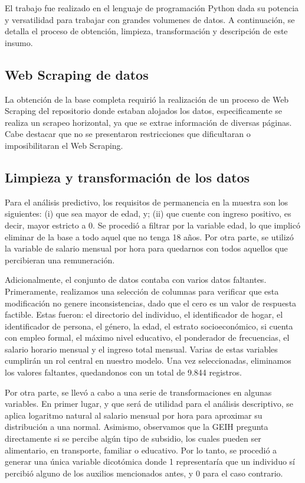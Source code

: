 \documentclass[11pt,oneside]{article}
\begin{document}
	El trabajo fue realizado en el lenguaje de programación Python dada su potencia y versatilidad para trabajar con grandes volumenes de datos. A continuación, se detalla el proceso de obtención, limpieza, transformación y descripción de este insumo. 
	
	\subsection{Web Scraping de datos}
	
	La obtención de la base completa requirió la realización de un proceso de Web Scraping del repositorio donde estaban alojados los datos, especificamente se realiza un scrapeo horizontal, ya que se extrae información de diversas páginas. Cabe destacar que no se presentaron restricciones que dificultaran o imposibilitaran el Web Scraping. 
	
	\subsection{Limpieza y transformación de los datos}
	
	Para el análisis predictivo, los requisitos de permanencia en la muestra son los siguientes: (i) que sea mayor de edad, y; (ii) que cuente con ingreso positivo, es decir, mayor estricto a 0. Se procedió a filtrar por la variable edad, lo que implicó eliminar de la base a todo aquel que no tenga 18 años. Por otra parte, se utilizó la variable de salario mensual por hora para quedarnos con todos aquellos que percibieran una remuneración. 
	
	Adicionalmente, el conjunto de datos contaba con varios datos faltantes. Primeramente, realizamos una selección de columnas para verificar que esta modificación no genere inconsistencias, dado que el cero es un valor de respuesta factible. Estas fueron: el directorio del individuo, el identificador de hogar, el identificador de persona, el género, la edad, el estrato socioeconómico, si cuenta con empleo formal, el máximo nivel educativo, el ponderador de frecuencias, el salario horario mensual y el ingreso total mensual. Varias de estas variables cumplirán un rol central en nuestro modelo. Una vez seleccionadas, eliminamos los valores faltantes, quedandonos con un total de 9.844 registros.  
	
	Por otra parte, se llevó a cabo a una serie de transformaciones en algunas variables. En primer lugar, y que será de utilidad para el análisis descriptivo, se aplica logaritmo natural al salario mensual por hora para aproximar su distribución a una normal. Asimismo, observamos que la GEIH pregunta directamente si se percibe algún tipo de subsidio, los cuales pueden ser alimentario, en transporte, familiar o educativo. Por lo tanto, se procedió a generar una única variable dicotómica donde 1 representaría que un individuo sí percibió alguno de los auxilios mencionados antes, y 0 para el caso contrario.
	
\end{document}
